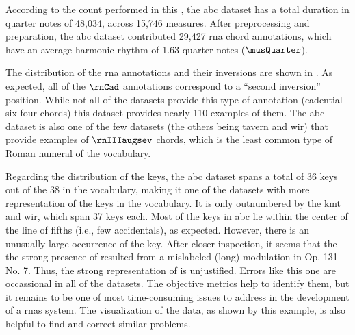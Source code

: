 
According to the count performed in this \thesisdiss{}, the
\gls{abc} dataset has a total duration in quarter notes of
48,034, across 15,746 measures. After preprocessing and
preparation, the \gls{abc} dataset contributed 29,427
\gls{rna} chord annotations, which have an average harmonic
rhythm of 1.63 quarter notes ($\musQuarter$).

The distribution of the \gls{rna} annotations and their
inversions are shown in . As
expected, all of the $\rnCad$ annotations correspond to a
``second inversion'' position. While not all of the datasets
provide this type of annotation (cadential six-four chords)
this dataset provides nearly 110 examples of them. The
\gls{abc} dataset is also one of the few datasets (the
others being \gls{tavern} and \gls{wir}) that provide
examples of $\rnIIIaugsev$ chords, which is the least common
type of Roman numeral of the vocabulary.


Regarding the distribution of the keys, the \gls{abc}
dataset spans a total of 36 keys out of the 38 in the
vocabulary, making it one of the datasets with more
representation of the keys in the vocabulary. It is only
outnumbered by the \gls{kmt} and \gls{wir}, which span 37
keys each. Most of the keys in \gls{abc} lie within the
center of the line of fifths (i.e., few accidentals), as
expected. However, there is an unusually large occurrence of
the \keyDs{} key. After closer inspection, it seems that the
the strong presence of \keyDs{} resulted from a mislabeled
(long) modulation in Op. 131 No. 7. Thus, the strong
representation of \keyDs{} is unjustified. Errors like this
one are occassional in all of the datasets. The objective
metrics help to identify them, but it remains to be one of
most time-consuming issues to address in the development of
a \glspl{rna} system. The visualization of the data, as
shown by this example, is also helpful to find and correct
similar problems.


